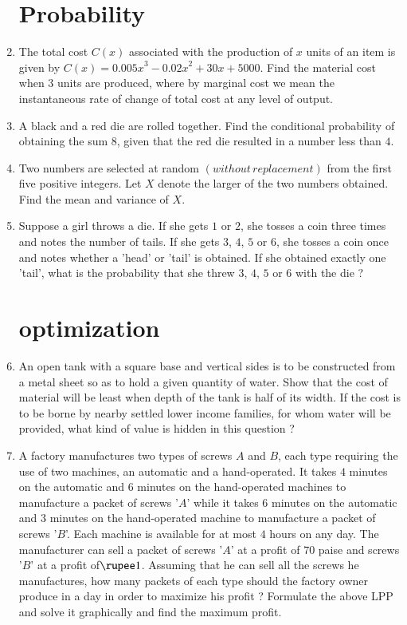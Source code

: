 \documentclass[10pt,-letter paper]{article}
\providecommand{\brak}[1]{\ensuremath{\left(#1\right)}}
\begin{document}
\begin{enumerate}
 \section{Probability}
\item The total cost $C\brak{x}$ associated with the production of $x$ units of an item is given by $C\brak{x} = {0.005x}^3-{0.02x}^2+30x+5000$. Find the material cost when $3$ units are produced, where by marginal cost we mean the instantaneous rate of change of total cost at any level of output.

		
\item A black and a red die are rolled together. Find the conditional probability of obtaining the sum $8$, given that the red die resulted in a number less than $4$.
\item Two numbers are selected at random \brak{without\hspace{2pt}replacement} from the first five positive integers. Let $X$ denote the larger of the two numbers obtained. Find the mean and variance of $X$.
\item  Suppose a girl throws a die. If she gets $1$ or $2$, she tosses a coin three times and notes the number of tails. If she gets $3$, $4$, $5$ or $6$, she tosses a coin once and notes whether a 'head' or 'tail' is obtained. If she obtained exactly one 'tail', what is the probability that she threw $3$, $4$, $5$ or $6$ with the die ? 
\section{optimization}
\item An open tank with a square base and vertical sides is to be constructed from a metal sheet so as to hold a given quantity of water. Show that the cost of material will be least when depth of the tank is half of its width. If the cost is to be borne by nearby settled lower income families, for whom water will be provided, what kind of value is hidden in this question ?

\item A factory manufactures two types of screws $A$ and $B$, each type requiring the use of two machines, an automatic and a hand-operated. It takes $4$ minutes on the automatic and $6$ minutes on the hand-operated machines to manufacture a packet of screws '$A$' while it takes $6$ minutes on the automatic and $3$ minutes on the hand-operated machine to manufacture a packet of screws '$B$'. Each machine is available for at most $4$ hours on any day. The manufacturer can sell a packet of screws '$A$' at a profit of $70$ paise and screws '$B$' at a profit of$\rupee 1$. Assuming that he can sell all the screws he manufactures, how many packets of each type should the factory owner produce in a day in order to maximize his profit ? Formulate the above LPP and solve it graphically and find the maximum profit.


\end{enumerate}
\end{document}
